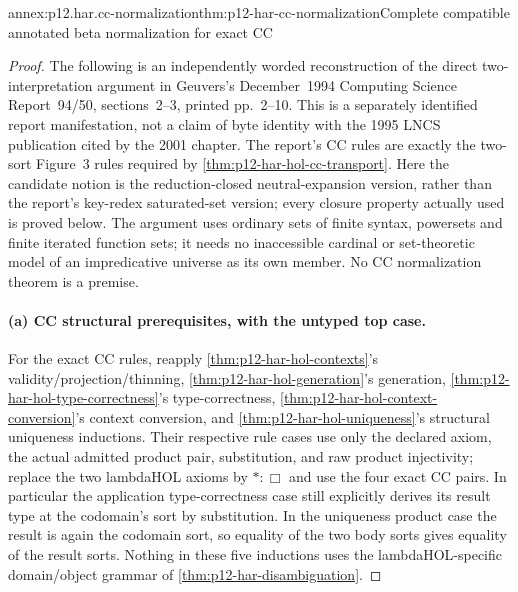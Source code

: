 \begin{annexitem}{annex:p12.har.cc-normalization}{thm:p12-har-cc-normalization}{Complete compatible annotated beta normalization for exact CC}
\begin{proof}
The following is an independently worded reconstruction of the direct
two-interpretation argument in Geuvers's December~1994 Computing Science
Report~94/50, sections~2--3, printed pp.~2--10. This is a separately
identified report manifestation, not a claim of byte identity with the
1995 LNCS publication cited by the 2001 chapter. The report's CC rules
are exactly the two-sort Figure~3 rules required by \cref{thm:p12-har-hol-cc-transport}. Here the
candidate notion is the reduction-closed neutral-expansion version,
rather than the report's key-redex saturated-set version; every closure
property actually used is proved below. The argument uses ordinary sets
of finite syntax, powersets and finite iterated function sets; it needs
no inaccessible cardinal or set-theoretic model of an impredicative
universe as its own member. No CC normalization theorem is a premise.

\paragraph{(a) CC structural prerequisites, with the untyped top case.}
For the exact CC rules, reapply \cref{thm:p12-har-hol-contexts}'s validity/projection/thinning,
\cref{thm:p12-har-hol-generation}'s generation, \cref{thm:p12-har-hol-type-correctness}'s type-correctness, \cref{thm:p12-har-hol-context-conversion}'s context conversion, and
\cref{thm:p12-har-hol-uniqueness}'s structural uniqueness inductions. Their respective rule cases use
only the declared axiom, the actual admitted product pair, substitution,
and raw product injectivity; replace the two lambdaHOL axioms by
\(\ast:\Box\) and use the four exact CC pairs. In particular the
application type-correctness case still explicitly derives its result
type at the codomain's sort by substitution. In the uniqueness product
case the result is again the codomain sort, so equality of the two body
sorts gives equality of the result sorts. Nothing in these five inductions
uses the lambdaHOL-specific domain/object grammar of \cref{thm:p12-har-disambiguation}.


\end{proof}
\end{annexitem}
